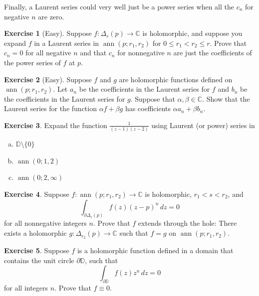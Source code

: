 \documentclass[12pt,openany]{book}
\newcommand{\ann}{\operatorname{ann}}
\newcommand{\C}{{\mathbb{C}}}
\newcommand{\D}{{\mathbb{D}}}
\theoremstyle{plain}
\theoremstyle{remark}
\theoremstyle{definition}
\newenvironment{exbox}{%
    \def\FrameCommand{\vrule width 1pt \relax\hspace {10pt}}%
    \MakeFramed {\advance \hsize -\width \FrameRestore }%
}{%
    \endMakeFramed
}
\newenvironment{exparts}{%
    \leavevmode\begin{enumerate}[a),noitemsep,topsep=0pt,parsep=0pt,partopsep=0pt]
}{%
    \end{enumerate}
}
\theoremstyle{exercise}
\newtheorem{exercise}{Exercise}[section]
\theoremstyle{example}
\begin{document}
Finally, a Laurent series could very well just be a power
series when all the $c_n$ for negative $n$ are zero.

\begin{exbox}
\begin{exercise}[Easy]
Suppose $f \colon \Delta_r(p) \to \C$ is holomorphic, and suppose you expand
$f$ in a Laurent series in $\ann(p;r_1,r_2)$ for $0 \leq r_1 < r_2 \leq r$.
Prove that $c_n = 0$ for all negative $n$ and that $c_n$ for nonnegative $n$
are just the coefficients of the power series of $f$ at $p$.
\end{exercise}

\begin{exercise}[Easy]
Suppose $f$ and $g$ are holomorphic functions defined on
$\ann(p;r_1,r_2)$.  Let $a_n$ be the coefficients in the Laurent series for
$f$ and $b_n$ be the coefficients in the Laurent series for $g$.  Suppose
that $\alpha,\beta \in \C$.  Show that the Laurent series for the function
$\alpha f + \beta g$ has coefficients $\alpha a_n + \beta b_n$.
\end{exercise}

\begin{exercise}
Expand the function $\frac{1}{(z-1)(z-2)}$ using Laurent (or power) series in 
\begin{exparts}
\item $\D \setminus \{ 0 \}$
\item $\ann(0;1,2)$
\item $\ann(0;2,\infty)$
\end{exparts}
\end{exercise}

\begin{exercise}
Suppose $f \colon \ann(p;r_1,r_2) \to \C$ is holomorphic,
$r_1 < s < r_2$, and
\begin{equation*}
\int_{\partial \Delta_{s}(p)} f(z){(z-p)}^n
 \, dz = 0
\end{equation*}
for all nonnegative integers $n$.  Prove that $f$ extends through the hole:
There exists a holomorphic $g \colon \Delta_{r_2}(p) \to \C$ such that 
$f = g$ on $\ann(p;r_1,r_2)$.
\end{exercise}

\begin{exercise}
Suppose $f$ is a holomorphic function defined in a domain that contains
the unit circle $\partial \D$, such that
\begin{equation*}
\int_{\partial \D} f(z)z^n
 \, dz = 0
\end{equation*}
for all integers $n$.  Prove that $f \equiv 0$.
\end{exercise}
\end{exbox}
\end{document}
